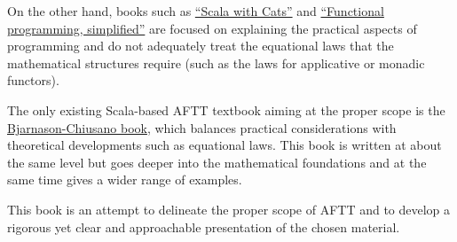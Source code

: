 On the other hand, books such as \href{https://underscore.io/books/scala-with-cats/}{\textquotedblleft Scala with Cats\textquotedblright}
and \href{https://alvinalexander.com/scala/functional-programming-simplified-book}{\textquotedblleft Functional programming, simplified\textquotedblright}
are focused on explaining the practical aspects of programming and
do not adequately treat the equational laws that the mathematical
structures require (such as the laws for applicative or monadic functors).

The only existing Scala-based AFTT textbook aiming at the proper scope
is the \href{https://www.manning.com/books/functional-programming-in-scala}{Bjarnason-Chiusano book},
which balances practical considerations with theoretical developments
such as equational laws. This book is written at about the same level
but goes deeper into the mathematical foundations and at the same
time gives a wider range of examples.

This book is an attempt to delineate the proper scope of AFTT and
to develop a rigorous yet clear and approachable presentation of the
chosen material. 
